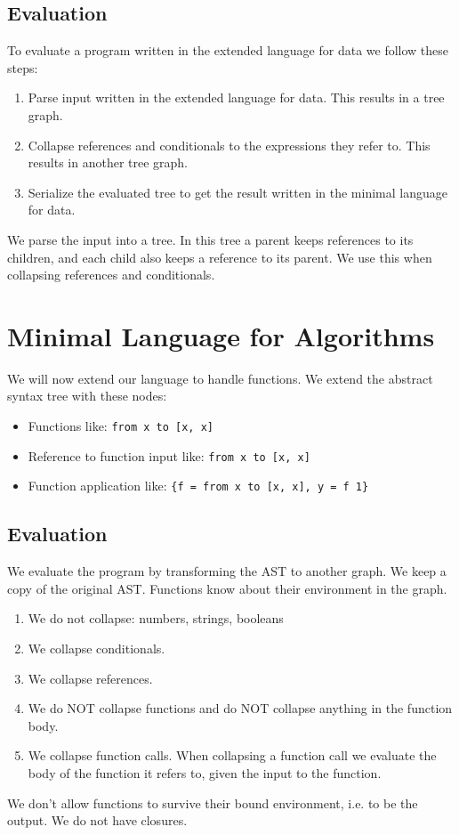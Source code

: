 \documentclass[a4paper,12pt]{article}
\begin{document}
\subsection{Evaluation}

To evaluate a program written in the extended language for data we follow these steps:
\begin{enumerate}
\item Parse input written in the extended language for data. This results in a tree graph.
\item Collapse references and conditionals to the expressions they refer to. This results in another tree graph.
\item Serialize the evaluated tree to get the result written in the minimal language for data.
\end{enumerate}
We parse the input into a tree. In this tree a parent keeps references to its children, and each child also keeps a reference to its parent. We use this when collapsing references and conditionals.

\section{Minimal Language for Algorithms}

We will now extend our language to handle functions. We extend the abstract syntax tree with these nodes:
\begin{itemize}
\item Functions like: \lstinline|from x to [x, x]|
\item Reference to function input like: \lstinline|from x to [x, x]|
\item Function application like: \lstinline|{f = from x to [x, x], y = f 1}|
\end{itemize}

\subsection{Evaluation}

We evaluate the program by transforming the AST to another graph. We keep a copy of the original AST. Functions know about their environment in the graph.
\begin{enumerate}
\item We do not collapse: numbers, strings, booleans
\item We collapse conditionals.
\item We collapse references.
\item We do NOT collapse functions and do NOT collapse anything in the function body.
\item We collapse function calls. When collapsing a function call we evaluate the body of the function it refers to, given the input to the function.
\end{enumerate}
We don't allow functions to survive their bound environment, i.e. to be the output. We do not have closures.
\end{document}
